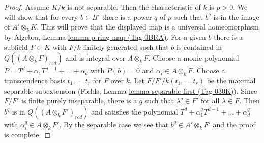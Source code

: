 \documentclass{amsart}
\theoremstyle{plain}
\theoremstyle{definition}
\theoremstyle{remark}
\numberwithin{equation}{subsection}
\begin{document}
\begin{proof}
\medskip\noindent
Assume $K/k$ is not separable. Then the characteristic of $k$ is $p > 0$.
We will show that for every $b \in B'$ there is a power $q$ of $p$
such that $b^q$ is in the image of $A' \otimes_k K$. This will prove
that the displayed map is a universal homeomorphism by
Algebra, Lemma \href{https://stacks.math.columbia.edu/tag/0BRA}{lemma p ring map (Tag 0BRA)}.
For a given $b$ there is a subfield $F \subset K$
with $F/k$ finitely generated such that $b$ is contained in
$Q((A \otimes_k F)_{red})$ and is integral over $A \otimes_k F$.
Choose a monic polynomial $P = T^d + \alpha_1 T^{d - 1} + \ldots + \alpha _d$
with $P(b) = 0$ and $\alpha_i \in A \otimes_k F$.
Choose a transcendence basis $t_1, \ldots, t_r$ for $F$ over $k$.
Let $F/F'/k(t_1, \ldots, t_r)$ be the maximal separable
subextension (Fields,  Lemma \href{https://stacks.math.columbia.edu/tag/030K}{lemma separable first (Tag 030K)}).
Since $F/F'$ is finite purely inseparable, there is a $q$ such
that $\lambda^q \in F'$ for all $\lambda \in F$. Then $b^q$ is
in $Q((A \otimes_k F')_{red})$ and satisfies the polynomial
$T^d + \alpha_1^q T^{d - 1} + \ldots + \alpha _d^q$ with
$\alpha_i^q \in A \otimes_k F'$. By the separable case
we see that $b^q \in A' \otimes_k F'$ and the proof is complete.
\end{proof}
\end{document}
